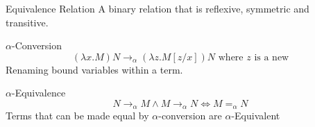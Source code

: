 \begin{definitionbox}{Equivalence Relation}
	A binary relation that is reflexive, symmetric and transitive.
\end{definitionbox}
\begin{tcbraster}[raster columns=2, raster equal height]
	\begin{definitionbox}{$\alpha$-Conversion}
		\[(\lambda x . M) N \to_\alpha (\lambda z. M[z/x]) N \text{ where }z \text{ is a new} \]
		Renaming bound variables within a term.
	\end{definitionbox}
	\begin{definitionbox}{$\alpha$-Equivalence}
		\[N \to_\alpha M \land M \to_\alpha N \Leftrightarrow M =_\alpha N\]
		Terms that can be made equal by $\alpha$-conversion are $\alpha$-Equivalent
	\end{definitionbox}
\end{tcbraster}
